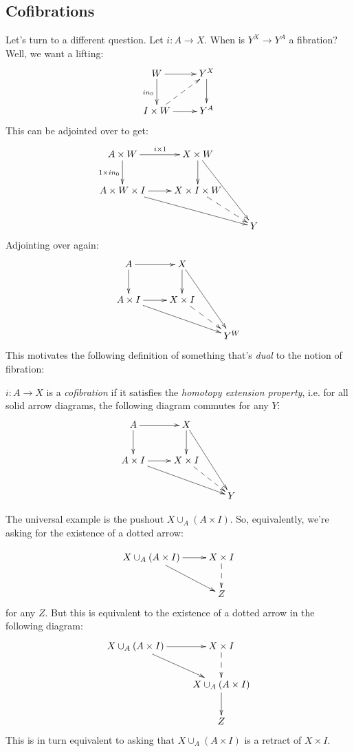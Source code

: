 \subsection{Cofibrations}
Let's turn to a different question. Let $i:A\to X$. When is $Y^X\to Y^A$ a fibration? Well, we want a lifting:
\begin{equation*}
    \xymatrix{
	W\ar[r]\ar[d]_{in_0} & Y^X\ar[d]\\
	I\times W\ar@{-->}[ur]\ar[r] & Y^A
    }
\end{equation*}
This can be adjointed over to get:
\begin{equation*}
    \xymatrix{
	A\times W\ar[r]^{i\times 1}\ar[d]_{1\times in_0} & X\times W\ar[d]\ar[ddr]& \\
	A\times W\times I \ar[r]\ar[drr] & X\times I\times W\ar@{-->}[dr] & \\
	& & Y
    }
\end{equation*}
Adjointing over again:
\begin{equation*}
    \xymatrix{
	A\ar[r]\ar[d] & X\ar[d]\ar[ddr] & \\
	A\times I\ar[r]\ar[drr] & X\times I\ar@{-->}[dr] & \\
	& & Y^W
    }
\end{equation*}
This motivates the following definition of something that's \emph{dual} to the notion of fibration:
\begin{definition}
    $i:A\to X$ is a \emph{cofibration} if it satisfies the \emph{homotopy extension property}, i.e. for all solid arrow diagrams, the following diagram commutes for any $Y$:
    \begin{equation*}
    \xymatrix{
	A\ar[r]\ar[d] & X\ar[d]\ar[ddr] & \\
	A\times I\ar[r]\ar[drr] & X\times I\ar@{-->}[dr] & \\
	& & Y
    }
    \end{equation*}
\end{definition}
The universal example is the pushout $X\cup_A (A\times I)$. So, equivalently, we're asking for the existence of a dotted arrow:

\begin{equation*}
    \xymatrix{
	X\cup_A (A\times I)\ar[r]\ar[dr] & X\times I\ar@{-->}[d]\\
	& Z
    }
\end{equation*}
for any $Z$. But this is equivalent to the existence of a dotted arrow in the following diagram:
\begin{equation*}
    \xymatrix{
	X\cup_A (A\times I)\ar[r]\ar[dr] & X\times I\ar@{-->}[d]\\
	& X\cup_A(A\times I)\ar[d]\\
	& Z
    }
\end{equation*}
This is in turn equivalent to asking that $X\cup_A (A\times I)$ is a retract of $X\times I$.

